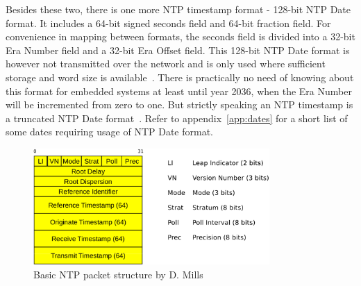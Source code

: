 Besides these two, there is one more NTP timestamp format - 128-bit NTP Date format.
It includes a 64-bit signed seconds field and 64-bit fraction field.
For convenience in mapping between formats,
the seconds field is divided into a 32-bit Era Number field
and a 32-bit Era Offset field.
This 128-bit NTP Date format is however not transmitted over the network
and is only used where sufficient storage and word size is available~\cite{rfc5905}.
There is practically no need of knowing about this format for embedded systems
at least until year 2036, when the Era Number will be incremented from zero to one.
But strictly speaking an NTP timestamp is a truncated NTP Date format~\cite{rfc5905}.
Refer to appendix~\ref{app:dates} for a short list of some dates
requiring usage of NTP Date format.

\begin{figure}
	\centering
	\includegraphics[width=9cm,keepaspectratio]{fig/ntp-packet.pdf}
	\caption{Basic NTP packet structure by D. Mills}
	\label{fig:ntp-packet}
	\bigskip
\end{figure}

